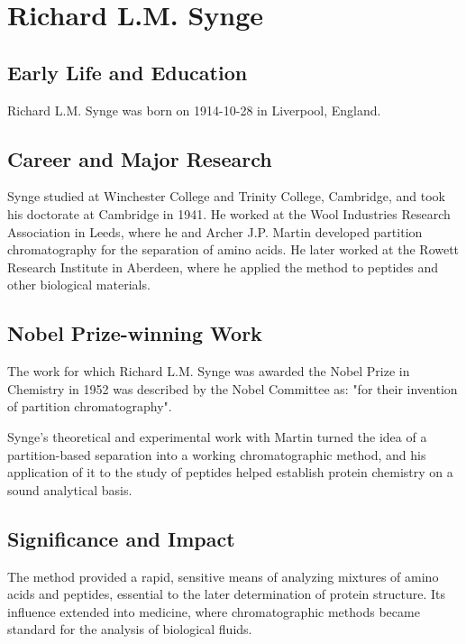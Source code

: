 \clearpage

\section{Richard L.M. Synge}

\subsection*{Early Life and Education}

Richard L.M. Synge was born on 1914-10-28 in Liverpool, England.

\subsection*{Career and Major Research}

Synge studied at Winchester College and Trinity College, Cambridge, and took his doctorate at Cambridge in 1941. He worked at the Wool Industries Research Association in Leeds, where he and Archer J.P. Martin developed partition chromatography for the separation of amino acids. He later worked at the Rowett Research Institute in Aberdeen, where he applied the method to peptides and other biological materials.

\subsection*{Nobel Prize-winning Work}

The work for which Richard L.M. Synge was awarded the Nobel Prize in Chemistry in 1952 was described by the Nobel Committee as: "for their invention of partition chromatography".

Synge's theoretical and experimental work with Martin turned the idea of a partition-based separation into a working chromatographic method, and his application of it to the study of peptides helped establish protein chemistry on a sound analytical basis.

\subsection*{Significance and Impact}

The method provided a rapid, sensitive means of analyzing mixtures of amino acids and peptides, essential to the later determination of protein structure. Its influence extended into medicine, where chromatographic methods became standard for the analysis of biological fluids.

